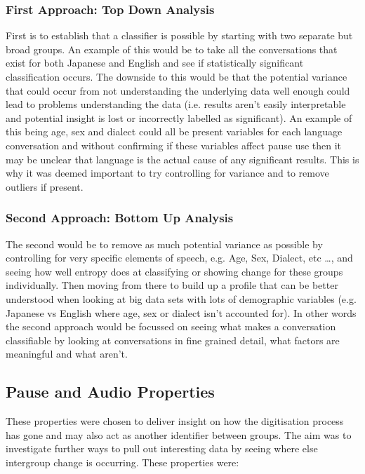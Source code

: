 \subsubsection{First Approach: Top Down Analysis}
First is to establish that a classifier is possible by starting with two separate but broad groups. An example of this would be to take all the conversations that exist for both Japanese and English and see if statistically significant classification occurs. The downside to this would be that the potential variance that could occur from not understanding the underlying data well enough could lead to problems understanding the data (i.e. results aren't easily interpretable and potential insight is lost or incorrectly labelled as significant). An example of this being age, sex and dialect could all be present variables for each language conversation and without confirming if these variables affect pause use then it may be unclear that language is the actual cause of any significant results. This is why it was deemed important to try controlling for variance and to remove outliers if present.

\subsubsection{Second Approach: Bottom Up Analysis}
The second would be to remove as much potential variance as possible by controlling for very specific elements of speech, e.g. Age, Sex, Dialect, etc \ldots, and seeing how well entropy does at classifying or showing change for these groups individually. Then moving from there to build up a profile that can be better understood when looking at big data sets with lots of demographic variables (e.g. Japanese vs English where age, sex or dialect isn't accounted for). In other words the second approach would be focussed on seeing what makes a conversation classifiable by looking at conversations in fine grained detail, what factors are meaningful and what aren't.

\subsection{Pause and Audio Properties}
These properties were chosen to deliver insight on how the digitisation process has gone and may also act as another identifier between groups. The aim was to investigate further ways to pull out interesting data by seeing where else intergroup change is occurring. These properties were:\\

